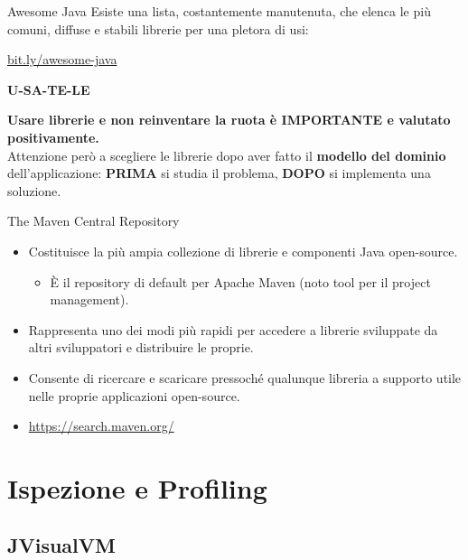 \documentclass[presentation]{beamer}
\begin{document}
\begin{frame}{Awesome Java}
	Esiste una lista, costantemente manutenuta, che elenca le più comuni, diffuse e stabili librerie per una pletora di usi:
	\begin{center}
		\url{bit.ly/awesome-java}
	\end{center}
	\begin{center}
		\begin{LARGE}\textbf{U-SA-TE-LE}\end{LARGE}
	\end{center}
	\begin{center}
		\textbf{Usare librerie e non reinventare la ruota è \alert{IMPORTANTE} e valutato positivamente.}\\
		Attenzione però a scegliere le librerie dopo aver fatto il \textbf{modello del dominio} dell'applicazione: \textbf{PRIMA} si studia il problema, \textbf{DOPO} si implementa una soluzione.
	\end{center}
\end{frame}

\begin{frame}{The Maven Central Repository}
\begin{itemize}\itemsep10pt
\item Costituisce la più ampia collezione di librerie e componenti Java open-source.
\begin{itemize}
\item È il repository di default per Apache Maven (noto tool per il project management).
\end{itemize}
\item Rappresenta uno dei modi più rapidi per accedere a librerie sviluppate da altri sviluppatori e distribuire le proprie.
\item Consente di ricercare e scaricare pressoché qualunque libreria a supporto utile nelle proprie applicazioni open-source.

\item \url{https://search.maven.org/}
\end{itemize}
\end{frame}


\section{Ispezione e Profiling}

\subsection{JVisualVM}
\end{document}
